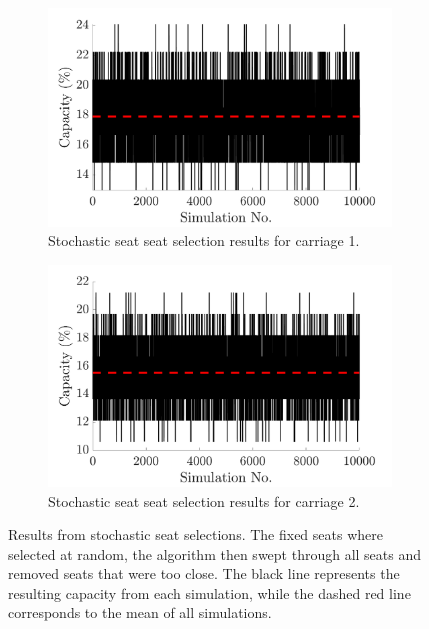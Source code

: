 \documentclass[11pt,a4paper]{article}
\begin{document}
\begin{figure}[H]
         \centering
 \begin{subfigure}[b]{0.48\textwidth}
         \centering
         \includegraphics[width=1\textwidth]{tfw_car1_sim_plot_write.png}
         \caption{Stochastic seat seat selection results for carriage 1.}
         \label{fig:sim1}
     \end{subfigure}
          \hfill
     \begin{subfigure}[b]{0.48\textwidth}
         \centering
         \includegraphics[width=1\textwidth]{tfw_car2_sim_plot_write.png}
         \caption{Stochastic seat seat selection results for carriage 2.}
         \label{fig:sim2}
     \end{subfigure}
     
 
 \caption{Results from stochastic seat selections. The fixed seats where selected at random, the algorithm then swept through all seats and removed seats that were too close. The black line represents the resulting capacity from each simulation, while the dashed red line corresponds to the mean of all simulations.}
        \label{fig:Stochastic_sims}
\end{figure}
\end{document}

